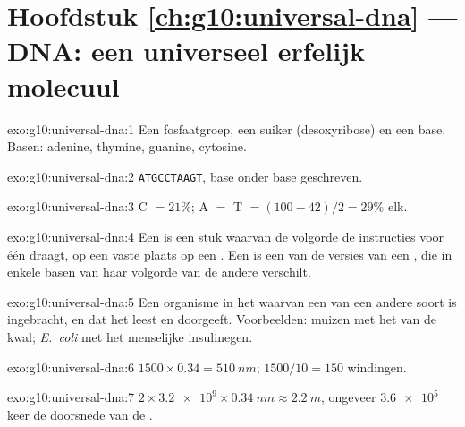 \section*{Hoofdstuk \ref{ch:g10:universal-dna} --- DNA: een universeel erfelijk molecuul}

\begin{solution}{exo:g10:universal-dna:1}
Een fosfaatgroep, een suiker (desoxyribose) en een base. Basen: adenine,
thymine, guanine, cytosine.
\end{solution}

\begin{solution}{exo:g10:universal-dna:2}
\texttt{ATGCCTAAGT}, base onder base geschreven.
\end{solution}

\begin{solution}{exo:g10:universal-dna:3}
C $= 21\%$; A $=$ T $= (100 - 42)/2 = 29\%$ elk.
\end{solution}

\begin{solution}{exo:g10:universal-dna:4}
Een  is een stuk  waarvan de volgorde de instructies voor één
 draagt, op een vaste plaats op een . Een  is een
van de versies van een , die in enkele basen van haar volgorde van de
andere verschilt.
\end{solution}

\begin{solution}{exo:g10:universal-dna:5}
Een organisme in het  waarvan een  van een andere soort is
ingebracht, en dat het leest en doorgeeft. Voorbeelden: muizen met het
 van de kwal; \emph{E.~coli} met het menselijke insulinegen.
\end{solution}

\begin{solution}{exo:g10:universal-dna:6}
$1500 \times 0.34 = \qty{510}{nm}$; $1500/10 = 150$ windingen.
\end{solution}

\begin{solution}{exo:g10:universal-dna:7}
$2 \times \num{3.2e9} \times \qty{0.34}{nm} \approx \qty{2.2}{m}$,
ongeveer $\num{3.6e5}$ keer de doorsnede van de .
\end{solution}

